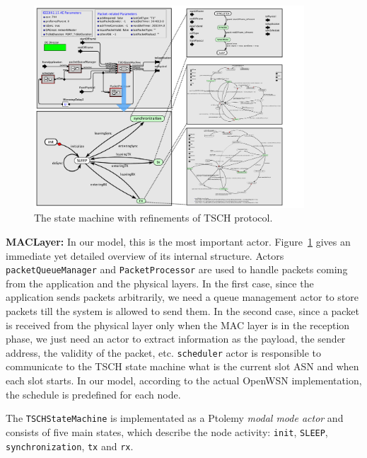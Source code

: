 \begin{figure}[t]
\centering
\includegraphics[width=0.9\textwidth]{figures/PaperTSCHStateMachine}
\caption{The state machine with refinements of TSCH protocol.}
\label{fig:TSCHSM}
\end{figure}

{\bf MACLayer:} In our model, this is the most important actor. Figure~\ref{fig:TSCHSM} gives an immediate yet detailed overview of its internal structure.
Actors \texttt{packetQueueManager} and \texttt{PacketProcessor} are used to handle packets coming from the application and the physical layers. In the first case, since the application sends packets arbitrarily, we need a queue management actor to store packets till the system is allowed to send them. In the second case, since a packet is received from the physical layer only when the MAC layer is in the reception phase, we just need an actor to extract information as the payload, the sender address, the validity of the packet, etc.
\texttt{scheduler} actor is responsible to communicate to the TSCH state machine what is the current slot ASN and when each slot starts. In our model, according to the actual OpenWSN implementation, the schedule is predefined for each node. 

The \texttt{TSCHStateMachine} is implementated as a Ptolemy \emph{modal mode actor} and consists of five main states, which describe the node activity: \texttt{init}, \texttt{SLEEP}, \texttt{synchronization}, \texttt{tx} and \texttt{rx}. 

